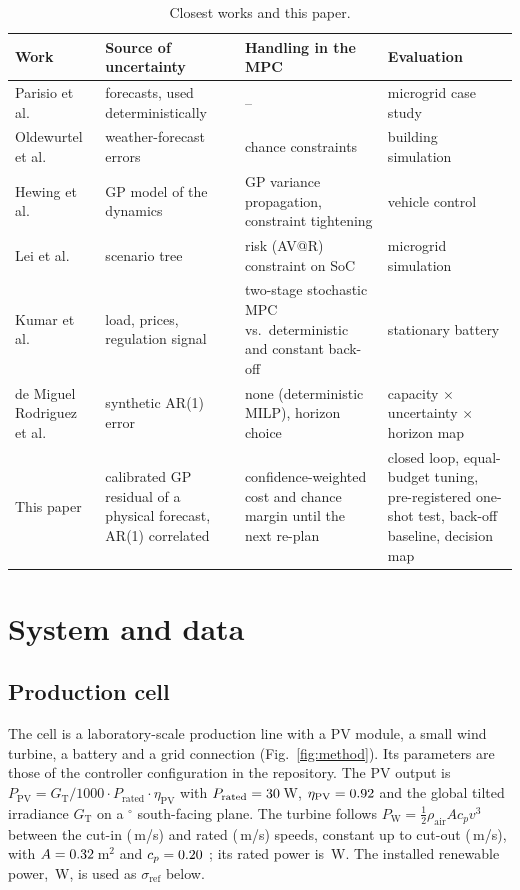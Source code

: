 \documentclass[a4paper,fleqn]{cas-dc}
\begin{document}
\begin{table}[t]
\caption{Closest works and this paper.}\label{tab:positioning}
\begin{tabular*}{\tblwidth}{@{}p{}p{}p{}p{}@{}}
\toprule
Work & Source of uncertainty & Handling in the MPC & Evaluation \\
\midrule
Parisio et al.\ \cite{parisio2014mpc} & forecasts, used deterministically & -- & microgrid case study \\
Oldewurtel et al.\ \cite{oldewurtel2012use} & weather-forecast errors & chance constraints & building simulation \\
Hewing et al.\ \cite{hewing2020cautious} & GP model of the dynamics & GP variance propagation, constraint tightening & vehicle control \\
Lei et al.\ \cite{lei2021optimal} & scenario tree & risk (AV@R) constraint on SoC & microgrid simulation \\
Kumar et al.\ \cite{kumar2019benchmarking} & load, prices, regulation signal & two-stage stochastic MPC vs.\ deterministic and constant back-off & stationary battery \\
de Miguel Rodriguez et al.\ \cite{demiguel2026mapping} & synthetic AR(1) error & none (deterministic MILP), horizon choice & capacity $\times$ uncertainty $\times$ horizon map \\
This paper & calibrated GP residual of a physical forecast, AR(1) correlated & confidence-weighted cost and chance margin until the next re-plan & closed loop, equal-budget tuning, pre-registered one-shot test, back-off baseline, decision map \\
\bottomrule
\end{tabular*}
\end{table}

\section{System and data}\label{sec:system}

\subsection{Production cell}
The cell is a laboratory-scale production line with a PV module, a small wind turbine, a battery and a grid connection (Fig.~\ref{fig:method}). Its parameters are those of the controller configuration in the repository. The PV output is $P_{\mathrm{PV}}=G_{\mathrm{T}}/1000\cdot P_{\mathrm{rated}}\cdot\eta_{\mathrm{PV}}$ with $P_{\mathrm{rated}}=30$\,W, $\eta_{\mathrm{PV}}=0.92$ and the global tilted irradiance $G_{\mathrm{T}}$ on a \tilt$^\circ$ south-facing plane. The turbine follows $P_{\mathrm{W}}=\tfrac12\rho_{\mathrm{air}}Ac_pv^3$ between the cut-in (\windcutin\,m/s) and rated (\windrated\,m/s) speeds, constant up to cut-out (\windcutout\,m/s), with $A=0.32$\,m$^2$ and $c_p=0.20$ \cite{manwell2009wind}; its rated power is \windratedpower\,W. The installed renewable power, \sigmaref\,W, is used as $\sigma_{\mathrm{ref}}$ below.
\end{document}
